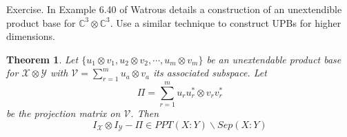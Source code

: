 \documentclass[12pt]{article}
\newcommand{\X}{\mathcal{X}}
\newcommand{\Y}{\mathcal{Y}}
\newtheorem{theorem}{Theorem}
\begin{document}
\begin{tcolorbox}
  Exercise. In Example 6.40 of Watrous details a construction of an unextendible product base for $\mathbb{C}^3 \otimes \mathbb{C}^3$. Use a similar technique to construct UPBs for higher dimensions.
\end{tcolorbox}

\begin{theorem}
Let $\{u_1 \otimes v_1, u_2 \otimes v_2, \cdots, u_m \otimes v_m \}$ be an unextendable product base for $\X \otimes \Y$ with $\mathcal{V} = \sum_{r=1}^m u_a \otimes v_a$ its associated subspace. Let
\[
\Pi = \sum_{r=1}^m u_ru_r^* \otimes v_rv_r^*
\]
be the projection matrix on $\mathcal{V}$. Then
\[
I_{\X} \otimes I_{\Y} - \Pi \in PPT(X : Y) \backslash Sep(X:Y)
\]
\end{theorem}
\end{document}
